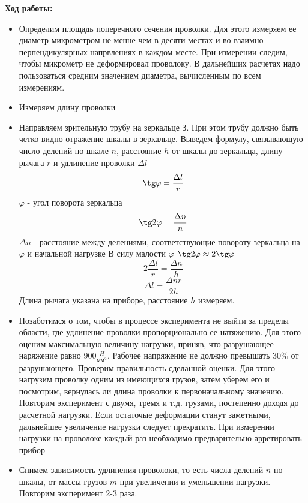 \documentclass[a4paper,12pt]{article} %
\begin{document}
\textbf{Ход работы:}
\begin{itemize}
\item Определим площадь поперечного сечения проволки. Для этого измеряем  ее диаметр микрометром не менне чем в десяти местах и во взаимно перпендикулярных напрвлениях в каждом месте. При измерении следим, чтобы микрометр не деформировал проволоку. В дальнейших расчетах надо пользоваться средним значением диаметра, вычисленным по всем измерениям.
\item Измеряем длину проволки
\item Направляем зрительную трубу на зеркальце З. При этом трубу должно быть четко видно отражение шкалы в зеркальце. Выведем формулу, связывающую число делений по шкале $n$, расстояние $h$ от шкалы до зеркальца, длину рычага $r$ и удлинение проволки $\Delta l$
\[\tg\varphi = \frac{\Delta l}{r}\]
$\varphi$ - угол поворота зеркальца
\[\tg 2\varphi = \frac{\Delta n}{n}\]
$\Delta n$ - расстояние между делениями, соответствующие повороту зеркальца на $\varphi$ и начальной нагрузке
В силу малости $\varphi$ $\tg 2\varphi \approx 2 \tg \varphi$
\[2\frac{\Delta l}{r} = \frac{\Delta n}{h}\]
\[\Delta l = \frac{\Delta n r}{2h}\]
Длина рычага указана на приборе, расстояние $h$ измеряем.
\item Позаботимся о том, чтобы в процессе эксперимента не выйти за пределы области, где удлинение проволки пропорционально ее натяжению. Для этого оценим максимальную величину нагрузки, приняв, что разрушающее наряжение равно $900 \frac{H}{\text{мм}^2}$. Рабочее напряжение не должно превышать $30\%$ от разрушающего. Проверим правильность сделанной оценки. Для этого нагрузим проволку одним из имеющихся грузов, затем уберем его и посмотрим, вернулась ли длина проволки к первоначальному значению. Повторим эксперимент с двумя, тремя и т.д. грузами, постепенно доходя до расчетной нагрузки. Если остаточые деформации станут заметными, дальнейшее увеличение нагрузки следует прекратить. При измерении нагрузки на проволоке каждый раз необходимо предварительно арретировать прибор
\item Снимем зависимость удлинения проволоки, то есть числа делений $n$ по шкалы, от массы грузов $m$ при увеличении и уменьшении нагрузки. Повторим эксперимент 2-3 раза.
\end{itemize}
\end{document}
